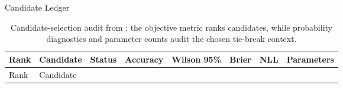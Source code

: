 \documentclass[
  ignorenonframetext,
]{beamer}
\begin{document}
\begin{frame}{Candidate Ledger}
\begin{longtable}[]{@{}
  >{\raggedright\arraybackslash}p{}
  >{\raggedright\arraybackslash}p{}
  >{\raggedright\arraybackslash}p{}
  >{\raggedright\arraybackslash}p{}
  >{\raggedright\arraybackslash}p{}
  >{\raggedright\arraybackslash}p{}
  >{\raggedright\arraybackslash}p{}
  >{\raggedright\arraybackslash}p{}@{}}
\caption{Candidate-selection audit from
\protect{}; the
objective metric ranks candidates, while probability diagnostics and
parameter counts audit the chosen tie-break
context.}\label{tbl:candidate-selection-audit}\tabularnewline
\toprule\noalign{}
\begin{minipage}[b]{\linewidth}\raggedright
Rank
\end{minipage} & \begin{minipage}[b]{\linewidth}\raggedright
Candidate
\end{minipage} & \begin{minipage}[b]{\linewidth}\raggedright
Status
\end{minipage} & \begin{minipage}[b]{\linewidth}\raggedright
Accuracy
\end{minipage} & \begin{minipage}[b]{\linewidth}\raggedright
Wilson 95\%
\end{minipage} & \begin{minipage}[b]{\linewidth}\raggedright
Brier
\end{minipage} & \begin{minipage}[b]{\linewidth}\raggedright
NLL
\end{minipage} & \begin{minipage}[b]{\linewidth}\raggedright
Parameters
\end{minipage} \\
\midrule\noalign{}
\endfirsthead
\toprule\noalign{}
\begin{minipage}[b]{\linewidth}\raggedright
Rank
\end{minipage} & \begin{minipage}[b]{\linewidth}\raggedright
Candidate
\end{minipage} & \begin{minipage}[b]{\linewidth}\raggedright

\end{minipage}
\end{longtable}
\end{frame}
\end{document}
